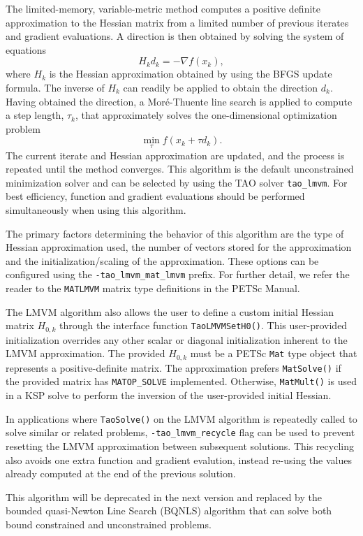 The limited-memory, variable-metric method computes a positive definite
approximation to the Hessian matrix from a limited number of previous
iterates and gradient evaluations.  A direction is then obtained by
solving the system of equations
\[
H_k d_k = -\nabla f(x_k),
\]
where $H_k$ is the Hessian approximation obtained by using the BFGS update 
formula.  The inverse of $H_k$ can readily be applied to obtain the 
direction $d_k$.  Having obtained the direction, a Mor\'{e}-Thuente 
line search is applied to compute a step length, $\tau_k$, that 
approximately solves the one-dimensional optimization problem
\[
\min_\tau f(x_k + \tau d_k).
\]
The current iterate and Hessian approximation are updated, and the process
is repeated until the method converges.  This algorithm is the default 
unconstrained minimization solver and can be selected by using the 
TAO solver {\tt tao\_lmvm}.  For best efficiency, function and gradient 
evaluations should be performed simultaneously when using this algorithm.

The primary factors determining the behavior of this algorithm are the type 
of Hessian approximation used, the number of vectors stored for the approximation 
and the initialization/scaling of the approximation. These options can be 
configured using the {\tt -tao\_lmvm\_mat\_lmvm} prefix. For further detail, 
we refer the reader to the {\tt MATLMVM} matrix type definitions in the PETSc 
Manual.

The LMVM algorithm also allows the user to define a custom initial 
Hessian matrix $H_{0,k}$ through the interface function {\tt TaoLMVMSetH0()}. 
This user-provided initialization overrides any other scalar or diagonal 
initialization inherent to the LMVM approximation. The provided $H_{0,k}$ must 
be a PETSc {\tt Mat} type object that represents a positive-definite matrix. 
The approximation prefers {\tt MatSolve()} if the provided matrix has 
{\tt MATOP\_SOLVE} implemented. Otherwise, {\tt MatMult()} is used in a KSP 
solve to perform the inversion of the user-provided initial Hessian.

In applications where {\tt TaoSolve()} on the LMVM algorithm is repeatedly called 
to solve similar or related problems, {\tt -tao\_lmvm\_recycle} flag can be used 
to prevent resetting the LMVM approximation between subsequent solutions. This 
recycling also avoids one extra function and gradient evalution, instead re-using 
the values already computed at the end of the previous solution.

This algorithm will be deprecated in the next version and replaced by the 
bounded quasi-Newton Line Search (BQNLS) algorithm that can solve both bound constrained 
and unconstrained problems.

